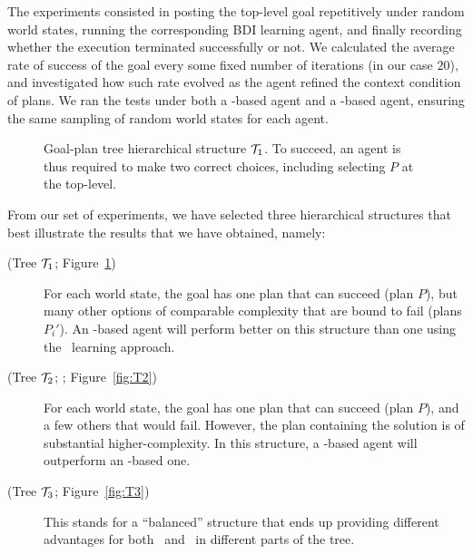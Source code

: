 The experiments consisted in posting the top-level goal repetitively under random
world states, running the corresponding  BDI learning agent, and finally
recording whether the execution terminated successfully or not.
We calculated the average rate of success of the goal every some fixed
number of iterations (in our case $20$), and investigated how such rate evolved
as the agent refined the context condition of plans.
We ran the tests under both a \BUL-based agent and a \CL-based agent,
ensuring the same sampling of random world states for each agent.

\begin{figure}[t]
\begin{center}

\end{center}
\caption{Goal-plan tree hierarchical structure ${\mathcal{T}}_1$. To succeed, an agent is thus required to make
two correct choices, including selecting $P$ at the top-level.}
\label{fig:T1}
\end{figure}


From our set of experiments, we have selected three hierarchical structures that
best illustrate the results that we have obtained, namely:
\begin{description}
\item[(Tree ${\mathcal{T}}_1$; Figure~\ref{fig:T1})] For each world state, the goal has
one plan that can succeed (plan $P$), but many other options of comparable
complexity that are bound to fail (plans $P_i'$). 
An \CL-based agent will perform better on this structure than one using the 
\BUL\ learning approach.

\item[(Tree ${\mathcal{T}}_2$; ; Figure~\ref{fig:T2})] For each world state, the goal has
one plan that can succeed (plan $P$), and a few others that would fail.
However, the plan containing the solution is of substantial higher-complexity. 
In this structure, a \BUL-based agent will outperform an \CL-based one.

\item[(Tree ${\mathcal{T}}_3$; Figure~\ref{fig:T3})] This stands for a ``balanced''
structure that ends up providing different advantages for both \BUL\ and \CL\ in
different parts of the tree.
\end{description}


